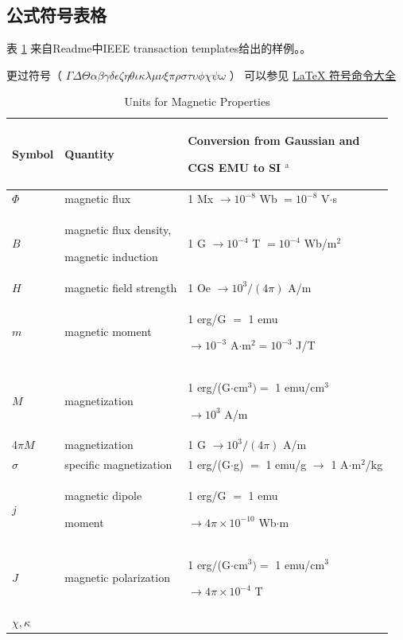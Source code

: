 \documentclass{template} %
\begin{document}
\subsection{公式符号表格}
表 \ref{tab:2} 来自Readme中IEEE transaction templates给出的样例。。

更过符号（ \textbf{$ \Gamma \Delta \Theta \alpha \beta \gamma \delta \epsilon \zeta\eta \theta \iota \kappa \lambda \mu \nu \xi \pi \rho \sigma \tau \upsilon \phi \chi \psi \omega$ }）
可以参见 \href{https://www.cnblogs.com/Coolxxx/p/5982439.html}{LaTeX 符号命令大全}

\begin{table}
  \centering 
  \caption{Units for Magnetic Properties}
  \label{tab:2}
  \setlength{\tabcolsep}{3pt}
  \begin{tabular}{|p{50pt}|p{150pt}|p{250pt}|}
  \hline
  Symbol& 
  Quantity& 
  Conversion from Gaussian and \par CGS EMU to SI $^{\mathrm{a}}$ \\
  \hline
  $\Phi $& 
  magnetic flux& 
  1 Mx $\to  10^{-8}$ Wb $= 10^{-8}$ V$\cdot $s \\
  $B$& 
  magnetic flux density, \par magnetic induction& 
  1 G $\to  10^{-4}$ T $= 10^{-4}$ Wb/m$^{2}$ \\
  $H$& 
  magnetic field strength& 
  1 Oe $\to  10^{3}/(4\pi )$ A/m \\
  $m$& 
  magnetic moment& 
  1 erg/G $=$ 1 emu \par $\to 10^{-3}$ A$\cdot $m$^{2} = 10^{-3}$ J/T \\
  $M$& 
  magnetization& 
  1 erg/(G$\cdot $cm$^{3}) =$ 1 emu/cm$^{3}$ \par $\to 10^{3}$ A/m \\
  4$\pi M$& 
  magnetization& 
  1 G $\to  10^{3}/(4\pi )$ A/m \\
  $\sigma $& 
  specific magnetization& 
  1 erg/(G$\cdot $g) $=$ 1 emu/g $\to $ 1 A$\cdot $m$^{2}$/kg \\
  $j$& 
  magnetic dipole \par moment& 
  1 erg/G $=$ 1 emu \par $\to 4\pi \times  10^{-10}$ Wb$\cdot $m \\
  $J$& 
  magnetic polarization& 
  1 erg/(G$\cdot $cm$^{3}) =$ 1 emu/cm$^{3}$ \par $\to 4\pi \times  10^{-4}$ T \\
  $\chi , \kappa $& 

\end{tabular}
\end{table}
\end{document}
